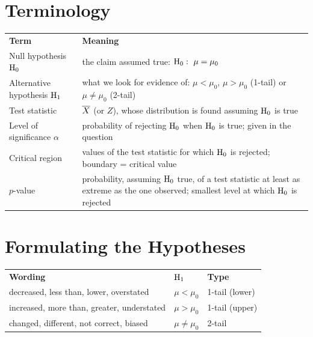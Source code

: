 \clearpage
{}
\section{Terminology}
\begin{center}\ba\small
\begin{tabular}{|M{3.8cm}|L{11.4cm}|}\hline
\textbf{Term} & \textbf{Meaning}\\\Xhline{2pt}
Null hypothesis $\mathrm{H}_{0}$ & the claim assumed true: $\mathrm{H}_{0}:\ \mu=\mu_{0}$\\\hline
Alternative hypothesis $\mathrm{H}_{1}$ & what we look for evidence of: $\mu<\mu_{0}$, $\mu>\mu_{0}$ (1-tail) or $\mu\neq\mu_{0}$ (2-tail)\\\hline
Test statistic & $\overline{X}$ (or $Z$), whose distribution is found assuming $\mathrm{H}_{0}$ is true\\\hline
Level of significance $\alpha$ & probability of rejecting $\mathrm{H}_{0}$ when $\mathrm{H}_{0}$ is true; given in the question\\\hline
Critical region & values of the test statistic for which $\mathrm{H}_{0}$ is rejected; boundary = critical value\\\hline
$p$-value & probability, assuming $\mathrm{H}_{0}$ true, of a test statistic at least as extreme as the one observed; smallest level at which $\mathrm{H}_{0}$ is rejected\\\hline
\end{tabular}\end{center}
\section{Formulating the Hypotheses}
\begin{center}\ba\small
\begin{tabular}{|L{6.4cm}|M{3.2cm}|M{3.4cm}|}\hline
\textbf{Wording} & $\mathrm{H}_{1}$ & \textbf{Type}\\\Xhline{2pt}
decreased, less than, lower, overstated & $\mu<\mu_{0}$ & 1-tail (lower)\\\hline
increased, more than, greater, understated & $\mu>\mu_{0}$ & 1-tail (upper)\\\hline
changed, different, not correct, biased & $\mu\neq\mu_{0}$ & 2-tail\\\hline
\end{tabular}\end{center}
\par
